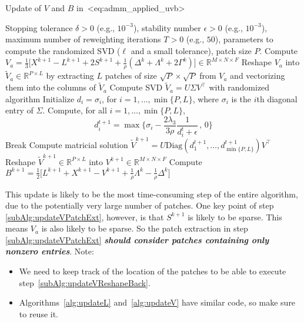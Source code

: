 \documentclass[a4paper,11pt]{article}
\def\eqref#1{<#1>}%
\begin{document}
\begin{algorithm}
	\caption{Update of $V$ and $B$ in~\eqref{eq:admm_applied_uvb}}
	\label{alg:updateV}
	\begin{algorithmic}[1]
		\algrenewcommand{}
		\Require Stopping tolerance $\delta > 0$ (e.g., $10^{-3}$), stability number $\epsilon > 0$ (e.g., $10^{-3}$), maximum number of
		reweighting iterations $T > 0$ (e.g., $50$), parameters to compute the
		randomized SVD ($\ell$ and a small tolerance), patch size $P$.
		\State Compute
		$ V_a =
			\frac{1}{3}
			\Big[
				X^{k+1} - L^{k+1}
				+
				2S^{k+1}
				+
				\frac{1}{\rho}(\Delta^k + \Lambda^k + 2\Gamma^{k})\Big]
			\in \mathbb{R}^{M\times N\times F}$
		\State Reshape $V_a$ into $\widetilde{V}_a \in \mathbb{R}^{P \times L}$ by
		extracting $L$ patches of size $\sqrt{P} \times \sqrt{P}$ from $V_a$ and vectorizing
		them into the columns of $\widetilde{V}_a$
		\label{subAlg:updateVPatchExt}
		\State Compute SVD $\widetilde{V}_a = U \Sigma V^\top$ with randomized
		algorithm
		\State Initialize $d_i = \sigma_i$, for $i = 1, \ldots, \min\{P, L\}$, where
		$\sigma_i$ is the $i$th diagonal entry of $\Sigma$.
		\State Compute, for all $i = 1, \ldots, \min\{P, L\}$,
		$$
			d_i^{t+1} = \max\Big\{\sigma_i - \frac{2\lambda_3}{3 \rho}\frac{1}{d_i^t + \epsilon}\, ,\, 0\Big\}
		$$
		\State Break
		\EndIf
		\EndFor
		\State Compute matricial solution $\widetilde{V}^{k+1} = U
			\text{Diag}(d_1^{t+1}, \ldots, d_{\min\{P, L\}}^{t+1}) V^\top$
		\State Reshape $\widetilde{V}^{k+1} \in \mathbb{R}^{P \times L}$ into
		$V^{k+1} \in \mathbb{R}^{M\times N\times F}$
		\label{subAlg:updateVReshapeBack}
		\State Compute
		$B^{k+1} = \frac{1}{2}\Big[L^{k+1} + X^{k+1} - V^{k+1} +\frac{1}{\rho}\Lambda^k - \frac{1}{\rho}\Delta^k\Big]$
	\end{algorithmic}
\end{algorithm}

This update is likely to be the most time-consuming step of the entire
algorithm, due to the potentially very large number of patches. One key point
of step \ref{subAlg:updateVPatchExt},
however, is that $S^{k+1}$ is likely to be sparse. This means $V_a$ is also
likely to be sparse. So the patch extraction in step
\ref{subAlg:updateVPatchExt} \textbf{\textit{should consider patches containing only nonzero
		entries}}. Note:
\begin{itemize}
	\item We need to keep track of the location of the patches to be able to
	      execute step~\ref{subAlg:updateVReshapeBack}.

	\item Algorithms~\ref{alg:updateL} and~\ref{alg:updateV} have similar code,
	      so make sure to reuse it.
\end{itemize}
\end{document}
